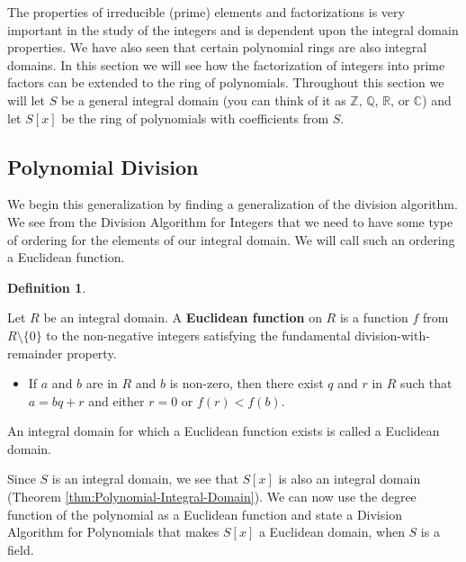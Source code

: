 \documentclass[
]{book}
\providecommand{\tightlist}{%
  \setlength{\itemsep}{0pt}\setlength{\parskip}{0pt}}
\theoremstyle{definition}
\newtheorem{definition}{Definition}[chapter]
\theoremstyle{definition}
\theoremstyle{definition}
\theoremstyle{definition}
\theoremstyle{remark}
\begin{document}
The properties of irreducible (prime) elements and factorizations is very important in the study of the integers and is dependent upon the integral domain properties. We have also seen that certain polynomial rings are also integral domains. In this section we will see how the factorization of integers into prime factors can be extended to the ring of polynomials. Throughout this section we will let \(S\) be a general integral domain (you can think of it as \(\mathbb{Z}\), \(\mathbb{Q}\), \(\mathbb{R}\), or \(\mathbb{C}\)) and let \(S[x]\) be the ring of polynomials with coefficients from \(S\).

\hypertarget{polynomial-division}{%
\subsection{Polynomial Division}\label{polynomial-division}}

We begin this generalization by finding a generalization of the division algorithm. We see from the Division Algorithm for Integers that we need to have some type of ordering for the elements of our integral domain. We will call such an ordering a Euclidean function.

\begin{definition}
\protect\hypertarget{def:unlabeled-div-119}{}\label{def:unlabeled-div-119}

Let \(R\) be an integral domain. A \textbf{Euclidean function} on \(R\) is a function \(f\) from \(R\setminus \{0\}\) to the non-negative integers satisfying the fundamental division-with-remainder property.

\begin{itemize}
\tightlist
\item
  If \(a\) and \(b\) are in \(R\) and \(b\) is non-zero, then there exist \(q\) and \(r\) in \(R\) such that \(a=bq+r\) and either \(r=0\) or \(f(r)<f(b)\).
\end{itemize}

An integral domain for which a Euclidean function exists is called a Euclidean domain.

\end{definition}

Since \(S\) is an integral domain, we see that \(S[x]\) is also an integral domain (Theorem \ref{thm:Polynomial-Integral-Domain}). We can now use the degree function of the polynomial as a Euclidean function and state a Division Algorithm for Polynomials that makes \(S[x]\) a Euclidean domain, when \(S\) is a field.
\end{document}
